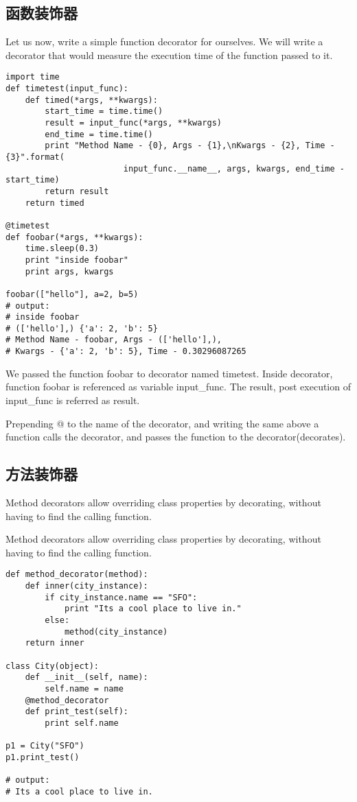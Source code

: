 \documentclass[10pt,a4paper]{ctexbook}
\begin{document}
\subsection{函数装饰器}
Let us now, write a simple function decorator for ourselves. We will write a decorator that would measure the execution time of the function passed to it.
\begin{verbatim}
import time
def timetest(input_func):
    def timed(*args, **kwargs):
        start_time = time.time()
        result = input_func(*args, **kwargs)
        end_time = time.time()
        print "Method Name - {0}, Args - {1},\nKwargs - {2}, Time - {3}".format(
                        input_func.__name__, args, kwargs, end_time - start_time)
        return result
    return timed

@timetest
def foobar(*args, **kwargs):
    time.sleep(0.3)
    print "inside foobar"
    print args, kwargs

foobar(["hello"], a=2, b=5)
# output:
# inside foobar
# (['hello'],) {'a': 2, 'b': 5}
# Method Name - foobar, Args - (['hello'],),
# Kwargs - {'a': 2, 'b': 5}, Time - 0.30296087265
\end{verbatim}

We passed the function foobar to decorator named timetest. Inside decorator, function foobar is referenced as variable input\_func. The result, post execution of input\_func is referred as result.

Prepending @ to the name of the decorator, and writing the same above a function calls the decorator, and passes the function to the decorator(decorates).

\subsection{方法装饰器}
Method decorators allow overriding class properties by decorating, without having to find the calling function.

Method decorators allow overriding class properties by decorating, without having to find the calling function.
\begin{verbatim}
def method_decorator(method):
    def inner(city_instance):
        if city_instance.name == "SFO":
            print "Its a cool place to live in."
        else:
            method(city_instance)
    return inner

class City(object):
    def __init__(self, name):
        self.name = name
    @method_decorator
    def print_test(self):
        print self.name

p1 = City("SFO")
p1.print_test()

# output:
# Its a cool place to live in.
\end{verbatim}
\end{document}
